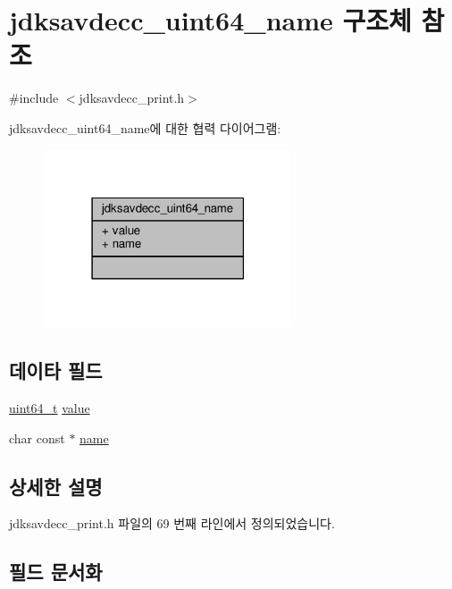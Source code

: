 \hypertarget{structjdksavdecc__uint64__name}{}\section{jdksavdecc\+\_\+uint64\+\_\+name 구조체 참조}
\label{structjdksavdecc__uint64__name}


{\ttfamily \#include $<$jdksavdecc\+\_\+print.\+h$>$}



jdksavdecc\+\_\+uint64\+\_\+name에 대한 협력 다이어그램\+:
\nopagebreak
\begin{figure}[H]
\begin{center}
\leavevmode
\includegraphics[width=207pt]{structjdksavdecc__uint64__name__coll__graph}
\end{center}
\end{figure}
\subsection*{데이타 필드}
\begin{DoxyCompactItemize}
\item 
\hyperlink{parse_8c_aec6fcb673ff035718c238c8c9d544c47}{uint64\+\_\+t} \hyperlink{structjdksavdecc__uint64__name_a4e630859cc0e2a22bd6acf39a6a8e218}{value}
\item 
char const $\ast$ \hyperlink{structjdksavdecc__uint64__name_a5f1de76dd5d451949e12c0fbc966ca70}{name}
\end{DoxyCompactItemize}


\subsection{상세한 설명}


jdksavdecc\+\_\+print.\+h 파일의 69 번째 라인에서 정의되었습니다.



\subsection{필드 문서화}
